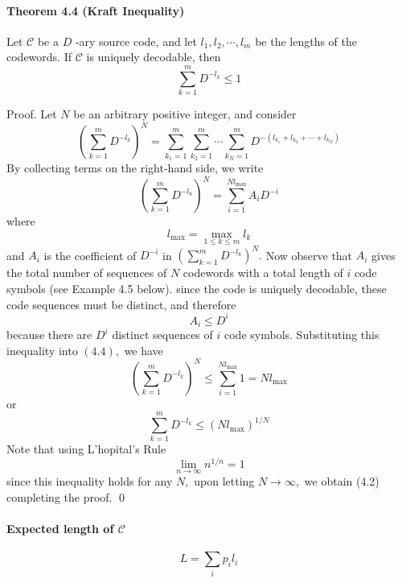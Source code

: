 \documentclass[8pt]{article}
\begin{document}
\begin{tcolorbox}
\paragraph{Theorem 4.4 (Kraft Inequality)} Let $\mathcal{C}$ be a $D$ -ary source code, and let $l_{1}, l_{2}, \cdots, l_{m}$ be the lengths of the codewords. If $\mathcal{C}$ is uniquely decodable, then
$$
\sum_{k=1}^{m} D^{-l_{k}} \leq 1
$$
\end{tcolorbox}
Proof. Let $N$ be an arbitrary positive integer, and consider
$$
\left(\sum_{k=1}^{m} D^{-l_{k}}\right)^{N}=\sum_{k_{1}=1}^{m} \sum_{k_{2}=1}^{m} \cdots \sum_{k_{N}=1}^{m} D^{-\left(l_{k_{1}}+l_{k_{2}}+\cdots+l_{k_{N}}\right)}
$$
By collecting terms on the right-hand side, we write
$$
\left(\sum_{k=1}^{m} D^{-l_{k}}\right)^{N}=\sum_{i=1}^{N l_{\max }} A_{i} D^{-i}
$$
where
$$
l_{\max }=\max _{1 \leq k \leq m} l_{k}
$$
and $A_{i}$ is the coefficient of $D^{-i}$ in $\left(\sum_{k=1}^{m} D^{-l_{k}}\right)^{N} .$ Now observe that $A_{i}$ gives the total number of sequences of $N$ codewords with a total length of $i$ code symbols (see Example 4.5 below). since the code is uniquely decodable, these code sequences must be distinct, and therefore
$$
A_{i} \leq D^{i}
$$
because there are $D^{i}$ distinct sequences of $i$ code symbols. Substituting this inequality into $(4.4),$ we have
$$
\left(\sum_{k=1}^{m} D^{-l_{k}}\right)^{N} \leq \sum_{i=1}^{N l_{\max }} 1=N l_{\max }
$$
or
$$
\sum_{k=1}^{m} D^{-l_{k}} \leq\left(N l_{\max }\right)^{1 / N}
$$
Note that using L'hopital's Rule
$$
\lim _{n \rightarrow \infty} n^{1 / n} = 1
$$
since this inequality holds for any $N,$ upon letting $N \rightarrow \infty,$ we obtain (4.2) completing the proof. \qed
\paragraph{Expected length of $\mathcal{C}$}
$$
L=\sum_{i} p_{i} l_{i} 
$$
\end{document}
